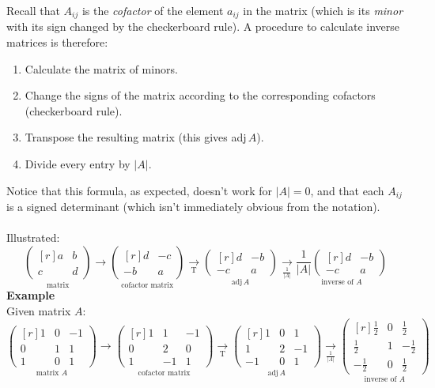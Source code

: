 \documentclass{report}
\begin{document}
Recall that $A_{ij}$ is the \textit{cofactor} of the element $a_{ij}$ in the matrix 
(which is its \textit{minor} with its sign changed by the checkerboard rule). A 
procedure to calculate inverse matrices is therefore:
\begin{enumerate}
\item Calculate the matrix of minors.
\item Change the signs of the matrix according to the corresponding cofactors (checkerboard rule).
\item Transpose the resulting matrix (this gives adj$\,A$).
\item Divide every entry by $|A|$.
\end{enumerate}
Notice that this formula, as expected, doesn't work for $|A|=0$, and that each 
$A_{ij}$ is a signed determinant (which isn't immediately obvious from the notation).\\
\vspace{1mm}\\
Illustrated:
\begin{equation*}
\underset{\text{matrix}}{
\begin{pmatrix*}[r]
a&b\\
c&d
\end{pmatrix*}}
\rightarrow
\underset{\text{cofactor matrix}}{
\begin{pmatrix*}[r]
d&-c\\
-b&a
\end{pmatrix*}}
\underset{\text{T}}{\rightarrow}
\underset{\text{adj}\,A}{
\begin{pmatrix*}[r]
d&-b\\
-c&a
\end{pmatrix*}}
\underset{\frac{1}{|A|}}{\rightarrow}
\underset{\text{inverse of }A}{\frac{1}{|A|}
\begin{pmatrix*}[r]
d&-b\\
-c&a
\end{pmatrix*}}
\end{equation*}
\textbf{Example}\\
Given matrix $A$:
\begin{equation*}
\underset{\text{matrix }A}{
\begin{pmatrix*}[r]
1&0&-1\\
0&1&1\\
1&0&1
\end{pmatrix*}}
\rightarrow
\underset{\text{cofactor matrix}}{
\begin{pmatrix*}[r]
1&1&-1\\
0&2&0\\
1&-1&1
\end{pmatrix*}}
\underset{\text{T}}{\rightarrow}
\underset{\text{adj}\,A}{
\begin{pmatrix*}[r]
1&0&1\\
1&2&-1\\
-1&0&1
\end{pmatrix*}}
\underset{\frac{1}{|A|}}{\rightarrow}
\underset{\text{inverse of }A}{
\begin{pmatrix*}[r]
\frac{1}{2}&0&\frac{1}{2}\\
\frac{1}{2}&1&-\frac{1}{2}\\
-\frac{1}{2}&0&\frac{1}{2}
\end{pmatrix*}}
\end{equation*}
\end{document}
